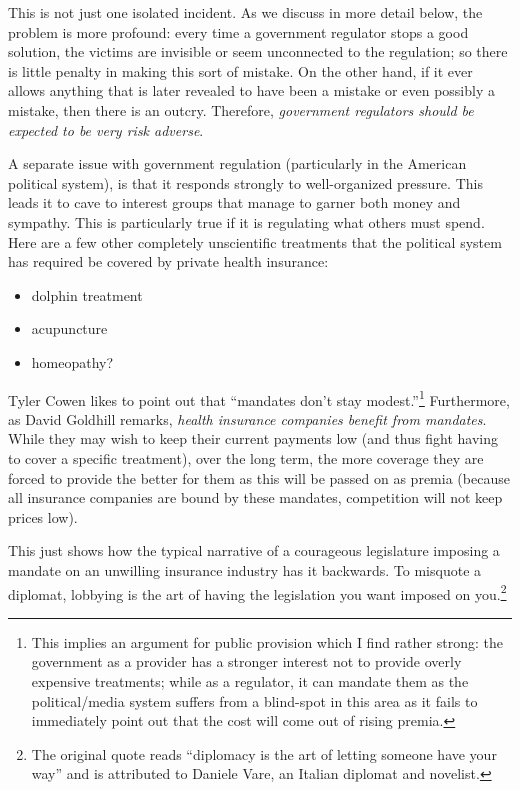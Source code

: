 This is not just one isolated incident. As we discuss in more detail below, the
problem is more profound: every time a government regulator stops a good
solution, the victims are invisible or seem unconnected to the regulation; so
there is little penalty in making this sort of mistake. On the other hand, if
it ever allows anything that is later revealed to have been a mistake or even
possibly a mistake, then there is an outcry. Therefore, \emph{government
regulators should be expected to be very risk adverse}.

A separate issue with government regulation (particularly in the American
political system), is that it responds strongly to well-organized pressure.
This leads it to cave to interest groups that manage to garner both money and
sympathy. This is particularly true if it is regulating what others must spend.
Here are a few other completely unscientific treatments that the political
system has required be covered by private health insurance:

\begin{itemize}
\item dolphin treatment
\item acupuncture
\item homeopathy?
\end{itemize}

Tyler Cowen likes to point out that ``mandates don't stay
modest.''\footnote{This implies an argument for public provision which I find
rather strong: the government as a provider has a stronger interest not to
provide overly expensive treatments; while as a regulator, it can mandate them
as the political/media system suffers from a blind-spot in this area as it
fails to immediately point out that the cost will come out of rising premia.}
Furthermore, as David Goldhill remarks, \emph{health insurance companies
benefit from mandates}. While they may wish to keep their current payments low
(and thus fight having to cover a specific treatment), over the long term, the
more coverage they are forced to provide the better for them as this will be
passed on as premia (because all insurance companies are bound by these
mandates, competition will not keep prices low).

This just shows how the typical narrative of a courageous legislature imposing
a mandate on an unwilling insurance industry has it backwards. To misquote a
diplomat, lobbying is the art of having the legislation you want imposed on
you.\footnote{The original quote reads ``diplomacy is the art of letting
someone have your way'' and is attributed to Daniele Vare, an Italian diplomat
and novelist.}

